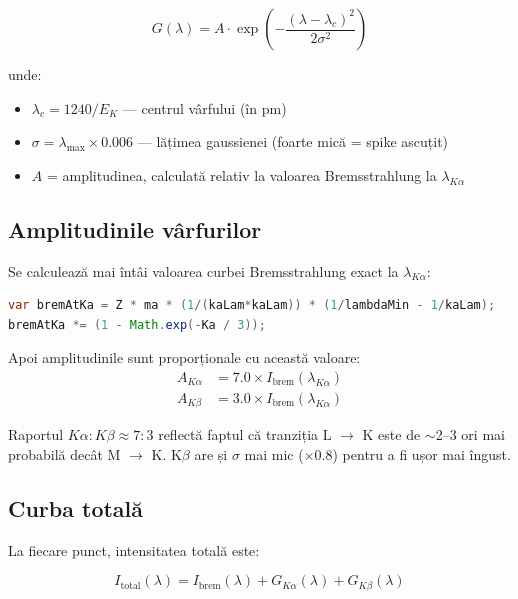 \documentclass[12pt,a4paper]{article}
\begin{document}
\begin{equation}
    G(\lambda) = A \cdot \exp\!\left(-\frac{(\lambda - \lambda_c)^2}{2\sigma^2}\right)
\end{equation}

\noindent unde:
\begin{itemize}[leftmargin=2em]
    \item $\lambda_c = 1240 / E_K$ — centrul vârfului (în pm)
    \item $\sigma = \lambda_{\max} \times 0.006$ — lățimea gaussienei (foarte mică = spike ascuțit)
    \item $A$ = amplitudinea, calculată relativ la valoarea Bremsstrahlung la $\lambda_{K\alpha}$
\end{itemize}

\subsection{Amplitudinile vârfurilor}

Se calculează mai întâi valoarea curbei Bremsstrahlung exact la $\lambda_{K\alpha}$:

\begin{lstlisting}[language=Java]
var bremAtKa = Z * ma * (1/(kaLam*kaLam)) * (1/lambdaMin - 1/kaLam);
bremAtKa *= (1 - Math.exp(-Ka / 3));
\end{lstlisting}

Apoi amplitudinile sunt proporționale cu această valoare:
\begin{align}
    A_{K\alpha} &= 7.0 \times I_{\text{brem}}(\lambda_{K\alpha}) \\
    A_{K\beta}  &= 3.0 \times I_{\text{brem}}(\lambda_{K\alpha})
\end{align}

Raportul $K\alpha : K\beta \approx 7 : 3$ reflectă faptul că tranziția L $\to$ K este de $\sim$2--3 ori mai probabilă decât M $\to$ K. K$\beta$ are și $\sigma$ mai mic ($\times 0.8$) pentru a fi ușor mai îngust.

\subsection{Curba totală}

La fiecare punct, intensitatea totală este:

\begin{equation}
    I_{\text{total}}(\lambda) = I_{\text{brem}}(\lambda) + G_{K\alpha}(\lambda) + G_{K\beta}(\lambda)
\end{equation}
\end{document}
